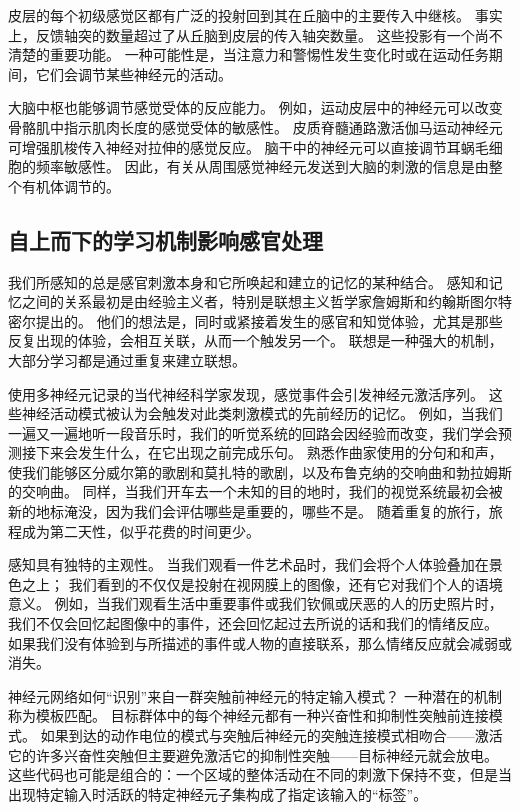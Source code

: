 皮层的每个初级感觉区都有广泛的投射回到其在丘脑中的主要传入中继核。 事实上，反馈轴突的数量超过了从丘脑到皮层的传入轴突数量。 这些投影有一个尚不清楚的重要功能。 一种可能性是，当注意力和警惕性发生变化时或在运动任务期间，它们会调节某些神经元的活动。

大脑中枢也能够调节感觉受体的反应能力。 例如，运动皮层中的神经元可以改变骨骼肌中指示肌肉长度的感觉受体的敏感性。 皮质脊髓通路激活伽马运动神经元可增强肌梭传入神经对拉伸的感觉反应。 脑干中的神经元可以直接调节耳蜗毛细胞的频率敏感性。 因此，有关从周围感觉神经元发送到大脑的刺激的信息是由整个有机体调节的。


\subsection{自上而下的学习机制影响感官处理}

我们所感知的总是感官刺激本身和它所唤起和建立的记忆的某种结合。 感知和记忆之间的关系最初是由经验主义者，特别是联想主义哲学家詹姆斯和约翰斯图尔特密尔提出的。 他们的想法是，同时或紧接着发生的感官和知觉体验，尤其是那些反复出现的体验，会相互关联，从而一个触发另一个。 联想是一种强大的机制，大部分学习都是通过重复来建立联想。

使用多神经元记录的当代神经科学家发现，感觉事件会引发神经元激活序列。 这些神经活动模式被认为会触发对此类刺激模式的先前经历的记忆。 例如，当我们一遍又一遍地听一段音乐时，我们的听觉系统的回路会因经验而改变，我们学会预测接下来会发生什么，在它出现之前完成乐句。 熟悉作曲家使用的分句和和声，使我们能够区分威尔第的歌剧和莫扎特的歌剧，以及布鲁克纳的交响曲和勃拉姆斯的交响曲。 同样，当我们开车去一个未知的目的地时，我们的视觉系统最初会被新的地标淹没，因为我们会评估哪些是重要的，哪些不是。 随着重复的旅行，旅程成为第二天性，似乎花费的时间更少。

感知具有独特的主观性。 当我们观看一件艺术品时，我们会将个人体验叠加在景色之上； 我们看到的不仅仅是投射在视网膜上的图像，还有它对我们个人的语境意义。 例如，当我们观看生活中重要事件或我们钦佩或厌恶的人的历史照片时，我们不仅会回忆起图像中的事件，还会回忆起过去所说的话和我们的情绪反应。 如果我们没有体验到与所描述的事件或人物的直接联系，那么情绪反应就会减弱或消失。

神经元网络如何“识别”来自一群突触前神经元的特定输入模式？ 一种潜在的机制称为模板匹配。 目标群体中的每个神经元都有一种兴奋性和抑制性突触前连接模式。 如果到达的动作电位的模式与突触后神经元的突触连接模式相吻合——激活它的许多兴奋性突触但主要避免激活它的抑制性突触——目标神经元就会放电。 这些代码也可能是组合的：一个区域的整体活动在不同的刺激下保持不变，但是当出现特定输入时活跃的特定神经元子集构成了指定该输入的“标签”。

